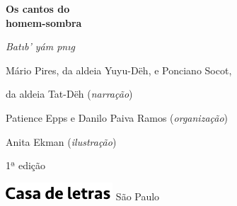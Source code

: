 




\begingroup\thispagestyle{empty}\vspace*{.05\textheight} 

              {\formular
              \huge
              \noindent
              \textbf{Os cantos do\\ homem-sombra}

              \vspace{0.6em}
              
              \Large
              \noindent
              \textit{Bat\i{}b’ yám p\I{}n\i{}g}
              }              
              \vspace{1cm}

              
              \small\noindent 
              Mário Pires, da aldeia Yuyu-Dëh, e Ponciano Socot,
              \vspace{-0.05cm}

              \noindent 
              da aldeia Tat-Dëh (\textit{narração})

              \medskip

              \noindent 
              Patience Epps e Danilo Paiva Ramos (\textit{organização})

              \medskip
              
              \noindent 
              Anita Ekman (\textit{ilustração})

              \vspace{0.5cm}

              \noindent
              1ª edição

              \vfill\noindent\includegraphics[width=0.3\textwidth]{LOGO_CDL.png}
              \break{} 
              \smallskip
              {\fontsize{30}{40}%
              \scriptsize\noindent São Paulo\quad\the\year}


\endgroup
\pagebreak
